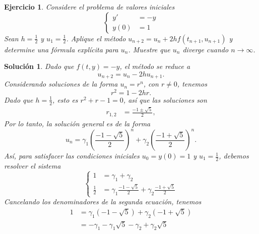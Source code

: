 \documentclass[11pt,letterpaper]{article}
\newtheorem{exercise}{Ejercicio}
\newtheorem*{sol}{Solución}
\begin{document}
\begin{exercise}
  Considere el problema de valores iniciales
  \begin{equation}
    \left\{
      \begin{aligned}
        y' &= -y
        \\
        y(0) &= 1
      \end{aligned}
    \right.
  \end{equation}
  Sean $h=\frac{1}{2}$ y $u_1=\frac{1}{2}$. Aplique el método
  $u_{n+2}=u_n + 2hf(t_{n+1},u_{n+1})$ y determine una fórmula
  explícita para $u_n$. Muestre que $u_n$ diverge cuando $n\to\infty$.
\end{exercise}
\begin{sol}
  Dado que $f(t,y)=-y$, el método se reduce a
  \begin{equation}
    u_{n+2}=u_n - 2hu_{n+1}
  .\end{equation}
  Considerando soluciones de la forma $u_n=r^{n}$, con $r\neq 0$,
  tenemos
  \begin{equation}
    r^{2} = 1 - 2hr
  .\end{equation}
  Dado que $h=\frac{1}{2}$, esto es $r^{2}+r-1=0$, así que las
  soluciones son
  \begin{align}
    r_{1,2} &= \frac{-1 \pm \sqrt{5}}{2}
  ,\end{align}
  Por lo tanto, la solución general es de la forma
  \begin{equation}
    u_n = \gamma_1 
    \left(\frac{-1 - \sqrt{5}}{2}\right)^{n}
    + \gamma_2
    \left(\frac{-1 + \sqrt{5}}{2}\right)^{n}
  .\end{equation}
  Así, para satisfacer las condiciones iniciales $u_0=y(0)=1$ y
  $u_1=\frac{1}{2}$, debemos resolver el sistema
  \begin{equation}
    \left\{
      \begin{aligned}
          1
          &= \gamma_1 
          + \gamma_2
        \\
          \frac{1}{2}
          &= \gamma_1 
          \frac{-1 - \sqrt{5}}{2}
          + \gamma_2
          \frac{-1 + \sqrt{5}}{2}
      \end{aligned}
    \right.
  \end{equation}
  Cancelando los denominadores de la segunda ecuación, tenemos
  \begin{align}
    1
    &= \gamma_1 (-1 - \sqrt{5}) + \gamma_2 (-1 + \sqrt{5}) \\
    &= -\gamma_1 -\gamma_1  \sqrt{5} -\gamma_2 +\gamma_2  \sqrt{5} \\

\end{align}
\end{sol}
\end{document}
